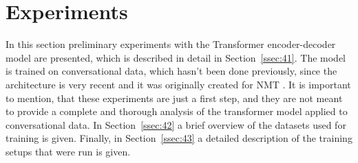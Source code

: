 \documentclass[12pt]{article}
\begin{document}
\newpage\section{Experiments} \label{sec:experiments}
In this section preliminary experiments with the Transformer encoder-decoder model are presented, which is described in detail in Section~\ref{ssec:41}. The model is trained on conversational data, which hasn't been done previously, since the architecture is very recent and it was originally created for NMT \cite{Vaswani:2017}. It is important to mention, that these experiments are just a first step, and they are not meant to provide a complete and thorough analysis of the transformer model applied to conversational data. In Section~\ref{ssec:42} a brief overview of the datasets used for training is given. Finally, in Section~\ref{ssec:43} a detailed description of the training setups that were run is given.
\end{document}
